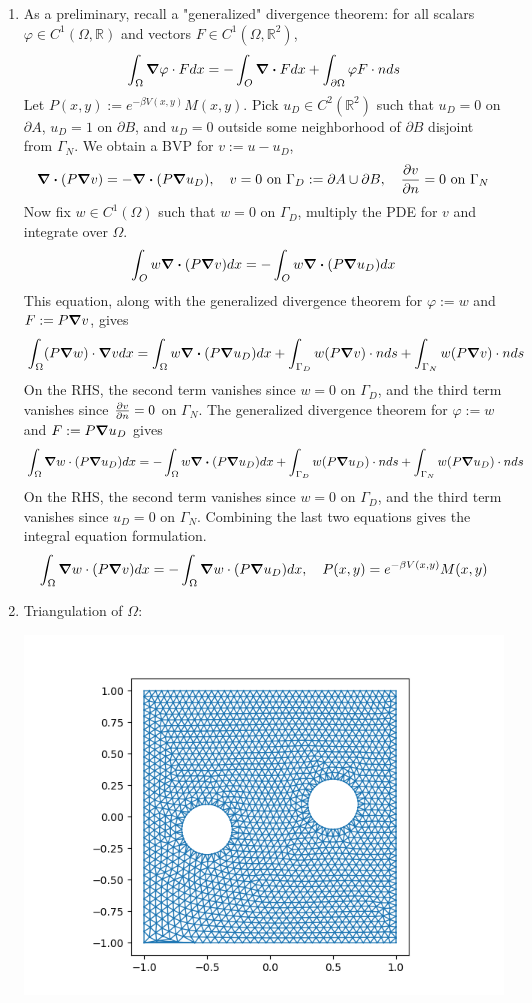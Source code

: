\documentclass{article}
\def\mbb#1{\mathbb{#1}}
\def\bR{\mbb{R}}
\newcommand{\vp}{\varphi}
\renewcommand{\d}{\partial}
\renewcommand{\O}{\Omega}
\newcommand{\G}{\Gamma}
\begin{document}
\begin{enumerate}
\begin{enumerate}
	
	\item As a preliminary, recall a "generalized" divergence theorem: for all scalars $\vp\in C^1(\O,\bR)$ and vectors $F\in C^1(\O,\bR^2)$,
	\[\int_\O\grad\vp\cdot Fdx = -\int_O\div Fdx + \int_{\d\O}\vp F\cdot nds\]
	Let $P(x,y):=e^{-\beta V(x,y)}M(x,y)$. Pick $u_D\in C^2(\bR^2)$ such that $u_D=0$ on $\d A$, $u_D=1$ on $\d B$, and $u_D=0$ outside some neighborhood of $\d B$ disjoint from $\G_N$. We obtain a BVP for $v:=u-u_D$,
	\[\div(P\grad v) = -\div(P\grad u_D),
	\quad v=0 \text{ on } \G_D:=\d A\cup\d B,
	\quad \pdv{v}{n}=0 \text{ on } \G_N\]
	Now fix $w\in C^1(\O)$ such that $w=0$ on $\G_D$, multiply the PDE for $v$ and integrate over $\O$.
	\[\int_O w\div(P\grad v)dx = -\int_O w\div(P\grad u_D)dx\]
	This equation, along with the generalized divergence theorem for $\vp:=w$ and $F:=P\grad v$, gives
	\[\int_\O (P\grad w)\cdot\grad vdx = \int_\O w\div(P\grad u_D)dx + \int_{\G_D} w(P\grad v)\cdot nds + \int_{\G_N} w(P\grad v)\cdot nds\]
	On the RHS, the second term vanishes since $w=0$ on $\G_D$, and the third term vanishes since $\pdv{v}{n}=0$ on $\G_N$. The generalized divergence theorem for $\vp:=w$ and $F:=P\grad u_D$ gives
	\[\int_\O \grad w\cdot(P\grad u_D)dx = -\int_\O w\div(P\grad u_D)dx + \int_{\G_D} w(P\grad u_D)\cdot nds + \int_{\G_N} w(P\grad u_D)\cdot nds\]
	On the RHS, the second term vanishes since $w=0$ on $\G_D$, and the third term vanishes since $u_D=0$ on $\G_N$. Combining the last two equations gives the integral equation formulation.
	\[\int_\O \grad w\cdot(P\grad v)dx = -\int_\O \grad w\cdot(P\grad u_D)dx,
	\quad P(x,y) = e^{-\beta V(x,y)}M(x,y)\]
	
	
	\item Triangulation of $\O$:
	\begin{center}
		\includegraphics[scale=.4]{final 2 mesh}
	\end{center}



\end{enumerate}
\end{enumerate}
\end{document}
